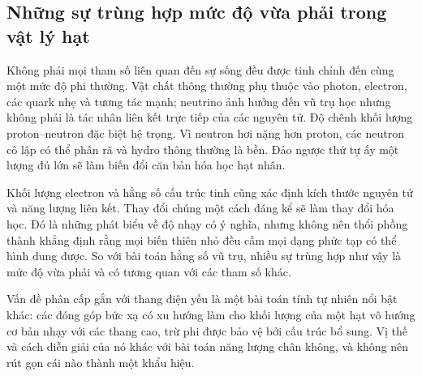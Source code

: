 \subsection{Những sự trùng hợp mức độ vừa phải trong vật lý hạt}

Không phải mọi tham số liên quan đến sự sống đều được tinh chỉnh đến cùng một mức độ phi thường. Vật chất thông thường phụ thuộc vào photon, electron, các quark nhẹ và tương tác mạnh; neutrino ảnh hưởng đến vũ trụ học nhưng không phải là tác nhân liên kết trực tiếp của các nguyên tử. Độ chênh khối lượng proton--neutron đặc biệt hệ trọng. Vì neutron hơi nặng hơn proton, các neutron cô lập có thể phân rã và hydro thông thường là bền. Đảo ngược thứ tự ấy một lượng đủ lớn sẽ làm biến đổi căn bản hóa học hạt nhân.

Khối lượng electron và hằng số cấu trúc tinh cũng xác định kích thước nguyên tử và năng lượng liên kết. Thay đổi chúng một cách đáng kể sẽ làm thay đổi hóa học. Đó là những phát biểu về độ nhạy có ý nghĩa, nhưng không nên thổi phồng thành khẳng định rằng mọi biến thiên nhỏ đều cấm mọi dạng phức tạp có thể hình dung được. So với bài toán hằng số vũ trụ, nhiều sự trùng hợp như vậy là mức độ vừa phải và có tương quan với các tham số khác.

Vấn đề phân cấp gắn với thang điện yếu là một bài toán tính tự nhiên nổi bật khác: các đóng góp bức xạ có xu hướng làm cho khối lượng của một hạt vô hướng cơ bản nhạy với các thang cao, trừ phi được bảo vệ bởi cấu trúc bổ sung. Vị thế và cách diễn giải của nó khác với bài toán năng lượng chân không, và không nên rút gọn cái nào thành một khẩu hiệu.

\begin{classroomqa}
\end{classroomqa}

\begin{classroomqa}
\end{classroomqa}


